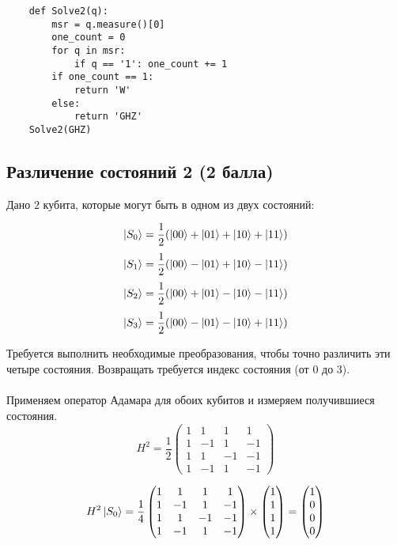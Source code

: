 \documentclass{article}
\begin{document}
\begin{verbatim}
    def Solve2(q):
        msr = q.measure()[0]
        one_count = 0
        for q in msr:
            if q == '1': one_count += 1
        if one_count == 1:
            return 'W'
        else:
            return 'GHZ'
    Solve2(GHZ)
\end{verbatim}



\subsection{Различение состояний 2 (2 балла)}

Дано $2$ кубита, которые могут быть в одном из двух состояний:

$$\Ket{S_0} = \frac{1}{2}(\Ket{00} + \Ket{01} + \Ket{10} + \Ket{11})$$
$$\Ket{S_1} = \frac{1}{2}(\Ket{00} - \Ket{01} + \Ket{10} - \Ket{11})$$
$$\Ket{S_2} = \frac{1}{2}(\Ket{00} + \Ket{01} - \Ket{10} - \Ket{11})$$
$$\Ket{S_3} = \frac{1}{2}(\Ket{00} - \Ket{01} - \Ket{10} + \Ket{11})$$


Требуется выполнить необходимые преобразования, чтобы точно различить эти четыре состояния. Возвращать требуется индекс состояния (от $0$ до $3$). 
\\\\

Применяем оператор Адамара для обоих кубитов и измеряем получившиеся состояния.\\

\begin{equation*}
H^2 = \frac{1}{2}
\begin{pmatrix}
1 & 1 & 1 & 1\\
1 & -1 & 1 & -1\\
1 & 1 & -1 & -1\\
1 & -1 & 1 & -1
\end{pmatrix}
\end{equation*}

\begin{equation*}
H^2\Ket{S_0} = \frac{1}{4}
\begin{pmatrix}
1 & 1 & 1 & 1\\
1 & -1 & 1 & -1\\
1 & 1 & -1 & -1\\
1 & -1 & 1 & -1
\end{pmatrix}
\times
\begin{pmatrix}
1 \\
1 \\
1 \\
1
\end{pmatrix}
=
\begin{pmatrix}
1 \\
0 \\
0 \\
0
\end{pmatrix}
\end{equation*}
\end{document}
